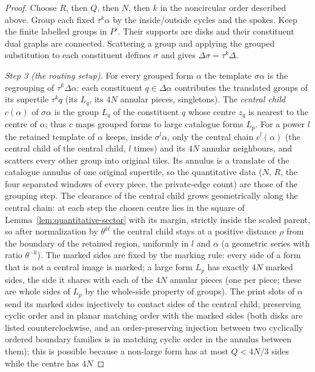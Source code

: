 \documentclass[11pt,a4paper]{article}
\theoremstyle{remark}
\begin{document}
\begin{proof}
Choose $R$, then $Q$, then $N$, then $k$ in the noncircular order described
above.  Group each fixed $\tau^k\alpha$ by the inside/outside cycles and
the spokes.  Keep the finite labelled groups in $P'$.  Their supports are
disks and their constituent dual graphs are connected.  Scattering a group
and applying the grouped substitution to each constituent defines $\sigma$
and gives $\Delta\sigma=\tau^k\Delta$.

\emph{Step 3 (the routing setup).}  For every grouped form $\alpha$ the
template $\sigma\alpha$ is the regrouping of $\tau^k\Delta\alpha$: each
constituent $q\in\Delta\alpha$ contributes the translated groups of its
supertile $\tau^kq$ (its $L_q$, its $4N$ annular pieces, singletons).  The
\emph{central child} $c(\alpha)$ of $\sigma\alpha$ is the group $L_q$ of the
constituent $q$ whose centre $z_q$ is nearest to the centre of $\alpha$; thus
$c$ maps grouped forms to large catalogue forms $L_p$.  For a power $l$ the
retained template of $\alpha$ keeps, inside $\sigma^l\alpha$, only the
central chain $c^l(\alpha)$ (the central child of the central child, $l$
times) and its $4N$ annular neighbours, and scatters every other group into
original tiles.  Its annulus is a translate of the catalogue annulus of one
original supertile, so the quantitative data ($N$, $R$, the four separated
windows of every piece, the private-edge count) are those of the grouping
step.  The clearance of the central child grows geometrically along the
central chain: at each step the chosen centre lies in the square of
Lemma~\ref{lem:quantitative-sector} with its margin, strictly inside the
scaled parent, so after normalization by $\theta^{kl}$ the central child
stays at a positive distance $\rho$ from the boundary of the retained region,
uniformly in $l$ and $\alpha$ (a geometric series with ratio $\theta^{-k}$).
The marked sides are fixed by the marking rule: every side of a form that is
not a central image is marked; a large form $L_p$ has exactly $4N$ marked
sides, the side it shares with each of the $4N$ annular pieces (one per
piece; these are whole sides of $L_p$ by the whole-side property of groups).
The print slots of $\alpha$ send its marked sides injectively to contact
sides of the central child, preserving cyclic order and in planar matching
order with the marked sides (both disks are listed counterclockwise, and an
order-preserving injection between two cyclically ordered boundary families
is in matching cyclic order in the annulus between them); this is possible
because a non-large form has at most $Q<4N/3$ sides while the centre has $4N$

\end{proof}
\end{document}
